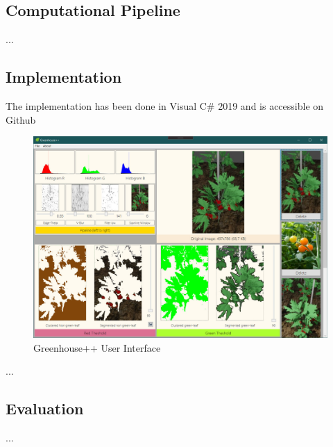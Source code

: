 \graphicspath{{members/ssr/figures/}}

\subsection{Computational Pipeline}\label{subsec:computational-pipeline}


...

\subsection{Implementation}


The implementation has been done in Visual C\# 2019 and is accessible on Github \cite{greenhouseplusplus}

\begin{figure}[h!]
    \includegraphics[width=\textwidth,height=\textheight,keepaspectratio]{implementation/greenhouseplusplus-ui.jpg}
    \caption{Greenhouse++ User Interface}
    \label{greenhouseplusplus:ui}
\end{figure}

...

\subsection{Evaluation}


...